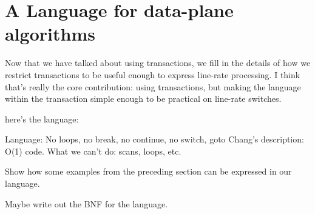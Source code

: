 \section{A Language for data-plane algorithms}
\label{s:language}

Now that we have talked about using transactions, we fill in the details of how we restrict transactions to be useful enough to express line-rate processing. I think that's really the core contribution: using transactions, but making the language within the transaction simple enough to be practical on line-rate switches.

here's the language:

Language: No loops, no break, no continue, no switch, goto
Chang's description: O(1) code.
What we can't do: scans, loops, etc.

Show how some examples from the preceding section can be expressed in our
language.

Maybe write out the BNF for the language.
